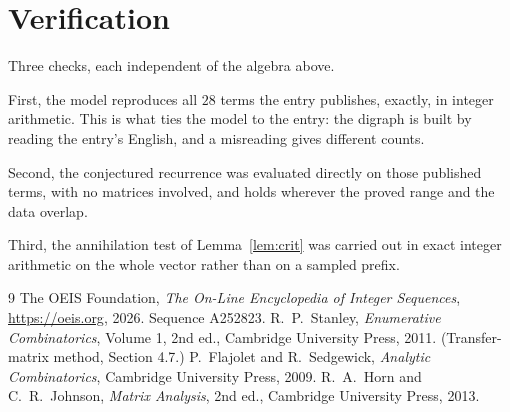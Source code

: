 \documentclass[11pt,a4paper]{article}
\theoremstyle{plain}
\theoremstyle{definition}
\begin{document}
\section{Verification}

Three checks, each independent of the algebra above.

First, the model reproduces all $28$ terms the entry publishes, exactly, in integer
arithmetic. This is what ties the model to the entry: the digraph is built by reading the
entry's English, and a misreading gives different counts.

Second, the conjectured recurrence was evaluated directly on those published terms, with no
matrices involved, and holds wherever the proved range and the data overlap.

Third, the annihilation test of Lemma~\ref{lem:crit} was carried out in exact integer
arithmetic on the whole vector rather than on a sampled prefix.

\begin{thebibliography}{9}
 The OEIS Foundation, \emph{The On-Line Encyclopedia of Integer
Sequences}, \url{https://oeis.org}, 2026. Sequence A252823.
 R.~P.~Stanley, \emph{Enumerative Combinatorics}, Volume 1, 2nd ed.,
Cambridge University Press, 2011. (Transfer-matrix method, Section 4.7.)
 P.~Flajolet and R.~Sedgewick, \emph{Analytic Combinatorics}, Cambridge
University Press, 2009.
 R.~A.~Horn and C.~R.~Johnson, \emph{Matrix Analysis}, 2nd ed., Cambridge
University Press, 2013.
\end{thebibliography}
\end{document}
